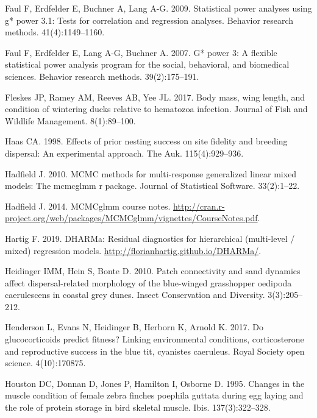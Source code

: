 \documentclass[
]{article}
\begin{document}
\leavevmode\hypertarget{ref-faul2009statistical}{}%
Faul F, Erdfelder E, Buchner A, Lang A-G. 2009. Statistical power
analyses using g* power 3.1: Tests for correlation and regression
analyses. Behavior research methods. 41(4):1149--1160.

\leavevmode\hypertarget{ref-faul2007g}{}%
Faul F, Erdfelder E, Lang A-G, Buchner A. 2007. G* power 3: A flexible
statistical power analysis program for the social, behavioral, and
biomedical sciences. Behavior research methods. 39(2):175--191.

\leavevmode\hypertarget{ref-fleskes2017body}{}%
Fleskes JP, Ramey AM, Reeves AB, Yee JL. 2017. Body mass, wing length,
and condition of wintering ducks relative to hematozoa infection.
Journal of Fish and Wildlife Management. 8(1):89--100.

\leavevmode\hypertarget{ref-haas1998effects}{}%
Haas CA. 1998. Effects of prior nesting success on site fidelity and
breeding dispersal: An experimental approach. The Auk. 115(4):929--936.

\leavevmode\hypertarget{ref-hadfield2010mcmc}{}%
Hadfield J. 2010. MCMC methods for multi-response generalized linear
mixed models: The mcmcglmm r package. Journal of Statistical Software.
33(2):1--22.

\leavevmode\hypertarget{ref-hadfield2014coursenotes}{}%
Hadfield J. 2014. MCMCglmm course notes.
\url{http://cran.r-project.org/web/packages/MCMCglmm/vignettes/CourseNotes.pdf}.

\leavevmode\hypertarget{ref-Hartig2019dharma}{}%
Hartig F. 2019. DHARMa: Residual diagnostics for hierarchical
(multi-level / mixed) regression models.
\url{http://florianhartig.github.io/DHARMa/}.

\leavevmode\hypertarget{ref-heidinger2010patch}{}%
Heidinger IMM, Hein S, Bonte D. 2010. Patch connectivity and sand
dynamics affect dispersal-related morphology of the blue-winged
grasshopper oedipoda caerulescens in coastal grey dunes. Insect
Conservation and Diversity. 3(3):205--212.

\leavevmode\hypertarget{ref-henderson2017glucocorticoids}{}%
Henderson L, Evans N, Heidinger B, Herborn K, Arnold K. 2017. Do
glucocorticoids predict fitness? Linking environmental conditions,
corticosterone and reproductive success in the blue tit, cyanistes
caeruleus. Royal Society open science. 4(10):170875.

\leavevmode\hypertarget{ref-houston1995changes}{}%
Houston DC, Donnan D, Jones P, Hamilton I, Osborne D. 1995. Changes in
the muscle condition of female zebra finches poephila guttata during egg
laying and the role of protein storage in bird skeletal muscle. Ibis.
137(3):322--328.
\end{document}
